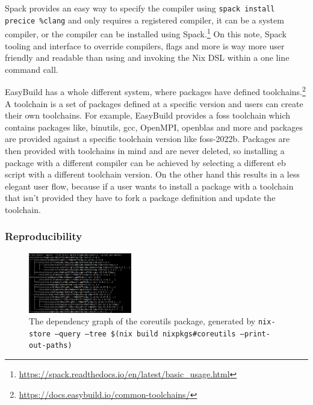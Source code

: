 \documentclass[conference,final,a4paper]{IEEEtran}
\begin{document}
Spack provides an easy way to specify the compiler using \texttt{spack install precice \%clang} and only requires a registered compiler, it can be a system compiler, or the compiler can be installed using Spack.\footnote{\url{https://spack.readthedocs.io/en/latest/basic_usage.html}}
On this note, Spack tooling and interface to override compilers, flags and more is way more user friendly and readable than using and invoking the Nix DSL within a one line command call.

EasyBuild has a whole different system, where packages have defined toolchains.\footnote{\url{https://docs.easybuild.io/common-toolchains/}}
A toolchain is a set of packages defined at a specific version and users can create their own toolchains.
For example, EasyBuild provides a foss toolchain which contains packages like, binutils, gcc, OpenMPI, openblas and more and packages are provided against a specific toolchain version like foss-2022b.
Packages are then provided with toolchains in mind and are never deleted, so installing a package with a different compiler can be achieved by selecting a different eb script with a different toolchain version.
On the other hand this results in a less elegant user flow, because if a user wants to install a package with a toolchain that isn't provided they have to fork a package definition and update the toolchain.\\

\subsubsection{Reproducibility}

\begin{figure}
    \centering
    \includegraphics[width=0.4\textwidth]{nix-tree.png}
    \caption{The dependency graph of the coreutils package, generated by \texttt{nix-store --query --tree \$(nix build nixpkgs\#coreutils --print-out-paths)}}
    \label{fig:nix-tree}
\end{figure}
\end{document}
